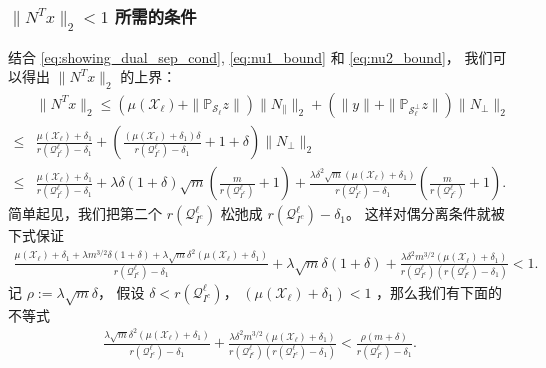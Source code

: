 \documentclass{ctexart}
\begin{document}
\subsubsection{ $\|N^T x\|_2<1$ 所需的条件}
结合 \eqref{eq:showing_dual_sep_cond}, \eqref{eq:nu1_bound} 和 \eqref{eq:nu2_bound}， 
我们可以得出 $\|N^T x\|_2$ 的上界：
\begin{align*}
  &\|N^T x\|_2 \leq (\mu(\mathcal{X}_{\ell})+\|\mathbb{P}_{\mathcal{S}_{\ell}}z\|) 
  \|N_{\parallel}\|_2+(\|y\|+\|\mathbb{P}_{\mathcal{S}_{\ell}^{\perp}}z\|)\|N_{\perp}\|_2\\
  \leq&\frac{\mu(\mathcal{X}_{\ell})+\delta_1}{r{\left( \mathcal{Q}_{I^c}^{\ell}\right)}-\delta_1}
  +\left(\frac{(\mu(\mathcal{X}_{\ell})+\delta_1)\delta}{r{\left( \mathcal{Q}_{I^c}^{\ell}\right)}-\delta_1}+1+\delta\right)
  \|N_{\perp}\|_2\\
  \leq& \frac{\mu(\mathcal{X}_{\ell})+\delta_1}{r{\left( \mathcal{Q}_{I^c}^{\ell}\right)}-\delta_1} +
  \lambda\delta(1+\delta)\sqrt{m} \left(\frac{m}{r(\mathcal{Q}_{I^c}^{\ell})}+1\right)
  + \frac{\lambda\delta^2\sqrt{m}(\mu(\mathcal{X}_{\ell})+\delta_1)}
  {r{\left( \mathcal{Q}_{I^c}^{\ell}\right)}-\delta_1}\left(\frac{m}{r(\mathcal{Q}_{I^c}^{\ell})}+1\right).
\end{align*}
简单起见，我们把第二个 $r(\mathcal{Q}_{I^c}^{\ell})$ 松弛成 $r(\mathcal{Q}_{I^c}^{\ell})-\delta_1$。
这样对偶分离条件就被下式保证
\begin{align*}
  \frac{\mu(\mathcal{X}_{\ell})+\delta_1 +\lambda m^{3/2}\delta(1+\delta)+
  \lambda\sqrt{m}\delta^2(\mu(\mathcal{X}_{\ell})+\delta_1)}
  {r{\left( \mathcal{Q}_{I^c}^{\ell}\right)}-\delta_1}
  + \lambda\sqrt{m}\delta(1+\delta)+\frac{\lambda\delta^2 m^{3/2}(\mu(\mathcal{X}_{\ell})+\delta_1)}
  {r{\left( \mathcal{Q}_{I^c}^{\ell}\right)}(r{\left( \mathcal{Q}_{I^c}^{\ell}\right)}-\delta_1)}  < 1.
\end{align*}
记 $\rho:=\lambda\sqrt{m}\delta$， 假设 $\delta<r{\left( \mathcal{Q}_{I^c}^{\ell}\right)}$，
$(\mu(\mathcal{X}_{\ell})+\delta_1)<1$ ，那么我们有下面的不等式
\begin{align*}
  \frac{\lambda\sqrt{m}\delta^2(\mu(\mathcal{X}_{\ell})+\delta_1)}
  {r{\left( \mathcal{Q}_{I^c}^{\ell}\right)}-\delta_1}
  +\frac{\lambda\delta^2 m^{3/2}(\mu(\mathcal{X}_{\ell})+\delta_1)}
  {r{\left( \mathcal{Q}_{I^c}^{\ell}\right)}(r{\left( \mathcal{Q}_{I^c}^{\ell}\right)}-\delta_1)}
  < \frac{\rho (m+\delta)}{r{\left( \mathcal{Q}_{I^c}^{\ell}\right)}-\delta_1}.
\end{align*}
\end{document}
